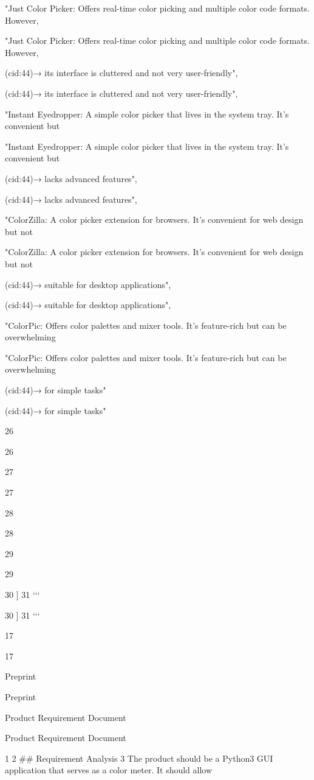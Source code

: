 \documentclass[12pt]{article}
\begin{document}
"Just Color Picker: Offers real-time color picking and multiple color code formats. However,


"Just Color Picker: Offers real-time color picking and multiple color code formats. However,


(cid:44)→ its interface is cluttered and not very user-friendly",


(cid:44)→ its interface is cluttered and not very user-friendly",


"Instant Eyedropper: A simple color picker that lives in the system tray. It’s convenient but


"Instant Eyedropper: A simple color picker that lives in the system tray. It’s convenient but


(cid:44)→ lacks advanced features",


(cid:44)→ lacks advanced features",


"ColorZilla: A color picker extension for browsers. It’s convenient for web design but not


"ColorZilla: A color picker extension for browsers. It’s convenient for web design but not


(cid:44)→ suitable for desktop applications",


(cid:44)→ suitable for desktop applications",


"ColorPic: Offers color palettes and mixer tools. It’s feature-rich but can be overwhelming


"ColorPic: Offers color palettes and mixer tools. It’s feature-rich but can be overwhelming


(cid:44)→ for simple tasks"


(cid:44)→ for simple tasks"


26


26


27


27


28


28


29


29


30 ]
31 ‘‘‘


30 ]
31 ‘‘‘


17


17


Preprint


Preprint


Product Requirement Document


Product Requirement Document


1
2 ## Requirement Analysis
3 The product should be a Python3 GUI application that serves as a color meter. It should allow
\end{document}
